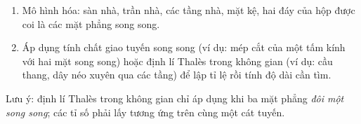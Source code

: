 \begin{enumerate}
\item Mô hình hóa: sàn nhà, trần nhà, các tầng nhà, mặt kệ, hai đáy của hộp được coi là các mặt phẳng song song.
\item Áp dụng tính chất giao tuyến song song (ví dụ: mép cắt của một tấm kính với hai mặt song song) hoặc định lí Thalès trong không gian (ví dụ: cầu thang, dây néo xuyên qua các tầng) để lập tỉ lệ rồi tính độ dài cần tìm.
\end{enumerate}
Lưu ý: định lí Thalès trong không gian chỉ áp dụng khi ba mặt phẳng \emph{đôi một song song}; các tỉ số phải lấy tương ứng trên cùng một cát tuyến.
